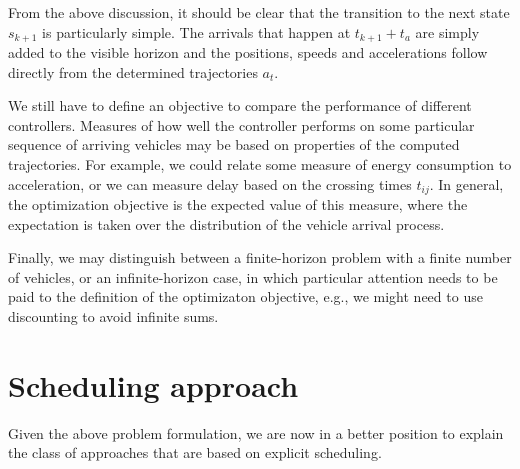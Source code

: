\documentclass{article}
\theoremstyle{definition}
\theoremstyle{plain}
\begin{document}
From the above discussion, it should be clear that the transition to the next
state $s_{k+1}$ is particularly simple. The arrivals that happen at
$t_{k+1} + t_{a}$ are simply added to the visible horizon and the positions,
speeds and accelerations follow directly from the determined trajectories
$a_{t}$.


We still have to define an objective to compare the performance of different
controllers. Measures of how well the controller performs on some particular
sequence of arriving vehicles may be based on properties of the computed
trajectories. For example, we could relate some measure of energy consumption to
acceleration, or we can measure delay based on the crossing times $t_{ij}$. In
general, the optimization objective is the expected value of this measure, where
the expectation is taken over the distribution of the vehicle arrival process.

Finally, we may distinguish between a finite-horizon problem with a finite
number of vehicles, or an infinite-horizon case, in which particular attention
needs to be paid to the definition of the optimizaton objective, e.g., we might
need to use discounting to avoid infinite sums.


\section{Scheduling approach}

Given the above problem formulation, we are now in a better position to explain
the class of approaches that are based on explicit scheduling.
\end{document}
